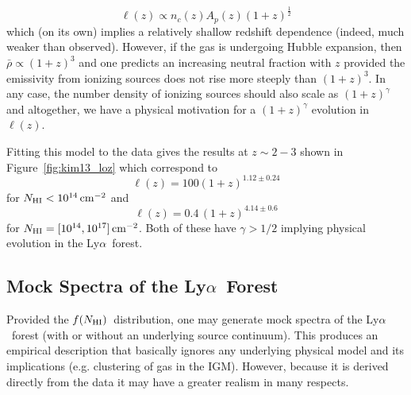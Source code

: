 \documentclass[graybox]{svmult}
\def\lya{Ly$\alpha$}
\def\ohf{\frac{1}{2}}
\newcommand{\mnhi}{N_{\rm HI}}
\newcommand{\nhi}{$\mnhi$}
\def\cm#1{\, {\rm cm^{#1}}}
\def\mfnhi{f(\mnhi)}
\def\fnhi{$\mfnhi$}
\begin{document}
\begin{equation}
\ell(z) \propto n_c(z) A_p(z) (1+z)^{\ohf}
\end{equation}
which (on its own) implies a relatively shallow
redshift dependence (indeed, much weaker than observed).
However, if the gas is undergoing Hubble expansion, then 
$\bar\rho \propto (1+z)^3$ and one predicts
an increasing neutral fraction with $z$ 
provided the emissivity from ionizing sources does
not rise more steeply than $(1+z)^3$.
In any case, the number density of ionizing sources
should also scale as $(1+z)^\gamma$
and altogether, we have a physical motivation for a $(1+z)^\gamma$
evolution in $\ell(z)$.

Fitting this model to the data gives
the results at $z \sim 2-3$ shown in Figure~\ref{fig:kim13_loz}
which correspond to
\begin{equation}
\ell(z) = 100 (1+z)^{1.12 \pm 0.24}
\end{equation}
for $\mnhi < 10^{14} \cm{-2}$ and
\begin{equation}
\ell(z) = 0.4 \, (1+z)^{4.14 \pm 0.6}
\end{equation}
for $\mnhi = [10^{14}, 10^{17}] \cm{-2}$.
Both of these have $\gamma > 1/2$ implying
physical evolution in the \lya\ forest.


\subsection{Mock Spectra of the \lya\ Forest}
Provided the \fnhi\ distribution, one may generate mock
spectra of the \lya\ forest (with or without an underlying
source continuum).  This produces an empirical description
that basically ignores any underlying physical model
and its implications (e.g. clustering of gas in the IGM).
However, because it is derived directly from the data it may
have a greater realism in many respects.  
\end{document}
